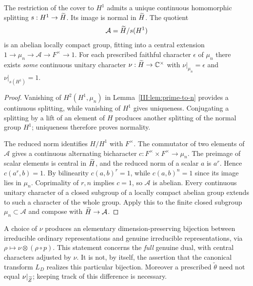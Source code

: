 \begin{proposition}\label{III:prop:tame-split}
The restriction of the cover to $H^1$ admits a unique continuous
homomorphic splitting $s:H^1\to\widetilde H$. Its image is normal in $\widetilde H$.
The quotient
\[
\mathcal A=\widetilde H/s(H^1)
\]
is an abelian locally compact group, fitting into a central extension
$1\to\mu_n\to\mathcal A\to F^\times\to1$.
For each prescribed faithful character $\epsilon$ of $\mu_n$ there exists
\emph{some} continuous unitary character $\nu:\widetilde H\to\mathbb C^\times$
with $\nu|_{\mu_n}=\epsilon$ and $\nu|_{s(H^1)}=1$.
\end{proposition}
\begin{proof}
Vanishing of $H^2(H^1,\mu_n)$ in Lemma~\ref{III:lem:prime-to-n}
provides a continuous splitting, while vanishing of $H^1$
gives uniqueness. Conjugating a splitting by a lift of an element
of $H$ produces another splitting of the normal group $H^1$;
uniqueness therefore proves normality.

The reduced norm identifies $H/H^1$ with $F^\times$.
The commutator of two elements of $\mathcal A$ gives a continuous
alternating bicharacter
$c:F^\times\times F^\times\to\mu_n$.
The preimage of scalar elements is central in $\widetilde H$, and the
reduced norm of a scalar $a$ is $a^r$. Hence $c(a^r,b)=1$.
By bilinearity $c(a,b)^r=1$, while $c(a,b)^n=1$ since its image
lies in $\mu_n$. Coprimality of $r,n$ implies $c=1$, so
$\mathcal A$ is abelian. Every continuous unitary character of a
closed subgroup of a locally compact abelian group extends to
such a character of the whole group. Apply this to the finite
closed subgroup $\mu_n\subset\mathcal A$ and compose with
$\widetilde H\to\mathcal A$.
\end{proof}

\begin{remark}\label{III:rem:tame-twist}
A choice of $\nu$ produces an elementary dimension-preserving
bijection between irreducible ordinary representations and genuine
irreducible representations, via
$\rho\mapsto\nu\otimes(\rho\circ p)$.
This statement concerns the \emph{full} genuine dual, with central
characters adjusted by $\nu$. It is not, by itself, the assertion
that the canonical transform $L_D$ realizes this particular bijection.
Moreover a prescribed $\widetilde\theta$ need not equal
$\nu|_{\widetilde Z}$; keeping track of this difference is necessary.
\end{remark}

